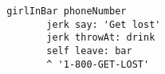 

%






\clearpage
\tableofcontents
\clearpage 

\lstset{style=smalltalk}


\begin{lstlisting}
 girlInBar phoneNumber 
        jerk say: 'Get lost'
        jerk throwAt: drink
        self leave: bar
        ^ '1-800-GET-LOST'
\end{lstlisting}




\clearpage
\printbibliography



\subsection{}
\emph{} 

~\\
